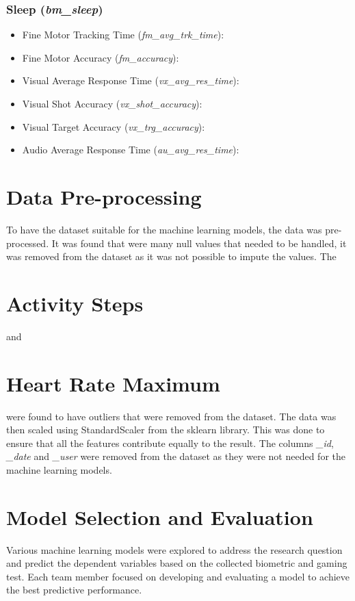 \subsubsection*{Sleep (\textit{bm\_sleep})}

\begin{itemize}
    \item Fine Motor Tracking Time (\textit{fm\_avg\_trk\_time}): 
    
    \item Fine Motor Accuracy (\textit{fm\_accuracy}): 
    
    \item Visual Average Response Time (\textit{vx\_avg\_res\_time}): 
    
    \item Visual Shot Accuracy (\textit{vx\_shot\_accuracy}): 
    
    \item Visual Target Accuracy (\textit{vx\_trg\_accuracy}): 
    
    \item Audio Average Response Time (\textit{au\_avg\_res\_time}):
    
\end{itemize}



\section{Data Pre-processing}
To have the dataset suitable for the machine learning models, the data was pre-processed. It was found that were many null values that needed to be handled, 
it was removed from the dataset as it was not possible to impute the values. The \section{Activity Steps} and \section{Heart Rate Maximum} were found to have
outliers that were removed from the dataset. The data was then scaled using StandardScaler from the sklearn library. This was done to ensure that all the features
contribute equally to the result.
The columns \textit{\_id}, \textit{\_date} and \textit{\_user} were removed from the dataset as they were not needed for the machine learning models.


\section{Model Selection and Evaluation}
Various machine learning models were explored to address the research question and predict the dependent variables based on the collected biometric and gaming test. Each team member
focused on developing and evaluating a model to achieve the best predictive performance. 


